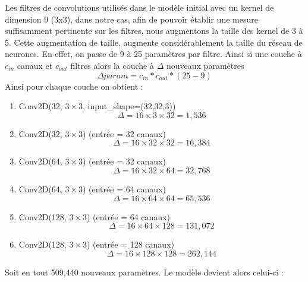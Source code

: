 \documentclass[12pt,a4paper]{article}
\begin{document}
Les filtres de convolutions utilisés dans le modèle initial avec un kernel de dimension 9 (3x3), dans notre cas, afin de pouvoir établir une mesure suffisamment pertinente sur les filtres, nous augmentons la taille des kernel de 3 à 5. Cette augmentation de taille, augmente considérablement la taille du réseau de neurones. En effet, on passe de 9 à 25 paramètres par filtre. Ainsi si une couche à $c_{in}$ canaux et $c_{out}$ filtres alors la couche à $\Delta$ nouveaux paramètres  
\[ \Delta param = c_{in} * c_{out} * (25-9) \]
Ainsi pour chaque couche on obtient : 
\begin{enumerate}
    \item Conv2D(32, $3\times3$, input\_shape=(32,32,3))  
    \[
    \Delta = 16 \times 3 \times 32 = 1,536
    \]

    \item Conv2D(32, $3\times3$) (entrée = 32 canaux)  
    \[
    \Delta = 16 \times 32 \times 32 = 16,384
    \]

    \item Conv2D(64, $3\times3$) (entrée = 32 canaux)  
    \[
    \Delta = 16 \times 32 \times 64 = 32,768
    \]

    \item Conv2D(64, $3\times3$) (entrée = 64 canaux)  
    \[
    \Delta = 16 \times 64 \times 64 = 65,536
    \]

    \item Conv2D(128, $3\times3$) (entrée = 64 canaux)  
    \[
    \Delta = 16 \times 64 \times 128 = 131,072
    \]

    \item Conv2D(128, $3\times3$) (entrée = 128 canaux)  
    \[
    \Delta = 16 \times 128 \times 128 = 262,144
    \]
\end{enumerate}
Soit en tout 509,440 nouveaux paramètres. Le modèle devient alors celui-ci : 
\end{document}
